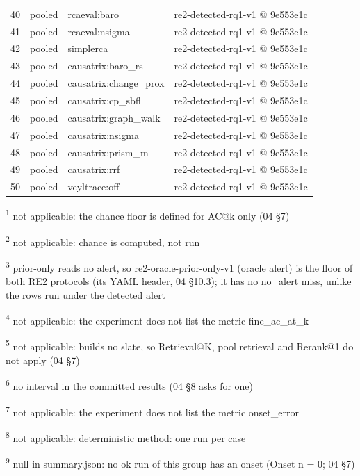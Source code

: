 \begin{longtable}{@{}r>{\raggedright\arraybackslash}p{18.0pt}>{\raggedright\arraybackslash}p{63.0pt}>{\raggedright\arraybackslash}p{105.0pt}@{}}
40 & pooled & rcaeval:baro & re2-detected-rq1-v1 @ 9e553e1c \\
41 & pooled & rcaeval:nsigma & re2-detected-rq1-v1 @ 9e553e1c \\
42 & pooled & simplerca & re2-detected-rq1-v1 @ 9e553e1c \\
43 & pooled & causatrix:baro\_rs & re2-detected-rq1-v1 @ 9e553e1c \\
44 & pooled & causatrix:change\_prox & re2-detected-rq1-v1 @ 9e553e1c \\
45 & pooled & causatrix:cp\_sbfl & re2-detected-rq1-v1 @ 9e553e1c \\
46 & pooled & causatrix:graph\_walk & re2-detected-rq1-v1 @ 9e553e1c \\
47 & pooled & causatrix:nsigma & re2-detected-rq1-v1 @ 9e553e1c \\
48 & pooled & causatrix:prism\_m & re2-detected-rq1-v1 @ 9e553e1c \\
49 & pooled & causatrix:rrf & re2-detected-rq1-v1 @ 9e553e1c \\
50 & pooled & veyltrace:off & re2-detected-rq1-v1 @ 9e553e1c \\
\end{longtable}
\par\raggedright\noindent
\textsuperscript{1} not applicable: the chance floor is defined for AC@k only (04 \S{}7)\par
\textsuperscript{2} not applicable: chance is computed, not run\par
\textsuperscript{3} prior-only reads no alert, so re2-oracle-prior-only-v1 (oracle alert) is the floor of both RE2 protocols (its YAML header, 04 \S{}10.3); it has no no\_alert miss, unlike the rows run under the detected alert\par
\textsuperscript{4} not applicable: the experiment does not list the metric fine\_ac\_at\_k\par
\textsuperscript{5} not applicable: builds no slate, so Retrieval@K, pool retrieval and Rerank@1 do not apply (04 \S{}7)\par
\textsuperscript{6} no interval in the committed results (04 \S{}8 asks for one)\par
\textsuperscript{7} not applicable: the experiment does not list the metric onset\_error\par
\textsuperscript{8} not applicable: deterministic method: one run per case\par
\textsuperscript{9} null in summary.json: no ok run of this group has an onset (Onset n = 0; 04 \S{}7)\par
